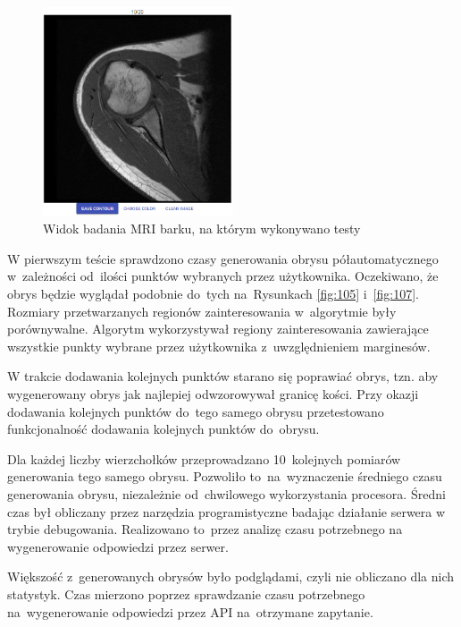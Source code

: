 \documentclass[a4paper,11pt,twoside,openright]{report}
\theoremstyle{definition}
\begin{document}
\begin{figure}[h!]
	\center
	\includegraphics[width=0.5\textwidth]{112}
	\caption{Widok badania MRI barku, na którym wykonywano testy}
    	\label{fig:112}
\end{figure}

\pagebreak

W pierwszym teście sprawdzono czasy generowania obrysu półautomatycznego
 w~zależności od~ilości punktów wybranych przez użytkownika. Oczekiwano,
że obrys będzie wyglądał podobnie do~tych na~Rysunkach \ref{fig:105} i~\ref{fig:107}.
Rozmiary przetwarzanych regionów zainteresowania w~algorytmie były porównywalne. Algorytm
wykorzystywał regiony zainteresowania zawierające wszystkie punkty wybrane
przez użytkownika z~uwzględnieniem marginesów.

W trakcie dodawania kolejnych punktów starano się poprawiać obrys, tzn. aby
wygenerowany obrys jak najlepiej odwzorowywał granicę kości. Przy okazji dodawania kolejnych
punktów do~tego samego obrysu przetestowano funkcjonalność dodawania kolejnych
punktów do~obrysu.

Dla każdej liczby wierzchołków przeprowadzano 10~kolejnych pomiarów generowania
tego samego obrysu. Pozwoliło to~na~wyznaczenie średniego czasu generowania obrysu,
niezależnie od~chwilowego wykorzystania procesora. Średni czas był obliczany przez narzędzia
programistyczne badając działanie serwera w trybie debugowania. Realizowano to~przez
analizę czasu potrzebnego na wygenerowanie odpowiedzi przez serwer.

Większość z~generowanych obrysów było podglądami, czyli nie obliczano dla nich
statystyk. Czas mierzono poprzez sprawdzanie czasu potrzebnego na~wygenerowanie
odpowiedzi przez API na~otrzymane zapytanie.
\end{document}
